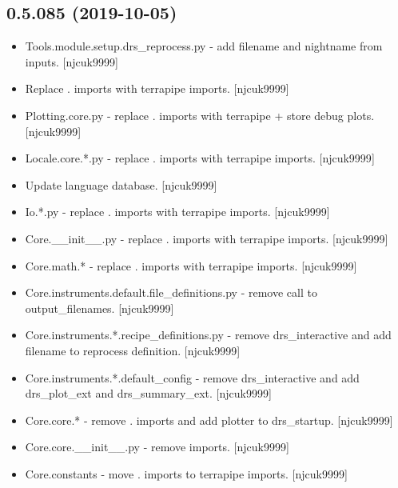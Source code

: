 \documentclass[a4paper,10pt,english]{report}
\begin{document}
\subsection{0.5.085 (2019-10-05)}
\label{\detokenize{misc/changelog:id56}}\begin{itemize}
\item {} 
Tools.module.setup.drs\_reprocess.py - add filename and nightname from
inputs. {[}njcuk9999{]}

\item {} 
Replace . imports with terrapipe imports. {[}njcuk9999{]}

\item {} 
Plotting.core.py - replace . imports with terrapipe + store debug
plots. {[}njcuk9999{]}

\item {} 
Locale.core.*.py - replace . imports with terrapipe imports.
{[}njcuk9999{]}

\item {} 
Update language database. {[}njcuk9999{]}

\item {} 
Io.*.py - replace . imports with terrapipe imports. {[}njcuk9999{]}

\item {} 
Core.\_\_init\_\_.py - replace . imports with terrapipe imports.
{[}njcuk9999{]}

\item {} 
Core.math.* - replace . imports with terrapipe imports. {[}njcuk9999{]}

\item {} 
Core.instruments.default.file\_definitions.py - remove call to
output\_filenames. {[}njcuk9999{]}

\item {} 
Core.instruments.*.recipe\_definitions.py - remove drs\_interactive and
add filename to reprocess definition. {[}njcuk9999{]}

\item {} 
Core.instruments.*.default\_config - remove drs\_interactive and add
drs\_plot\_ext and drs\_summary\_ext. {[}njcuk9999{]}

\item {} 
Core.core.* - remove . imports and add plotter to drs\_startup.
{[}njcuk9999{]}

\item {} 
Core.core.\_\_init\_\_.py - remove imports. {[}njcuk9999{]}

\item {} 
Core.constants - move . imports to terrapipe imports. {[}njcuk9999{]}

\end{itemize}
\end{document}
